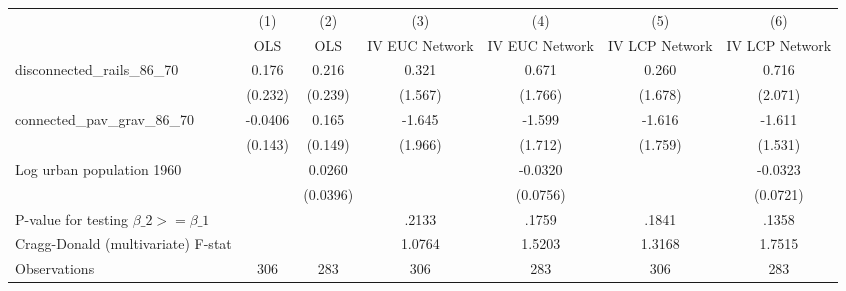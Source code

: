 {
\def\sym#1{\ifmmode^{#1}\else\(^{#1}\)\fi}
\begin{tabular}{l*{6}{c}}
\hline\hline
                &\multicolumn{1}{c}{(1)}&\multicolumn{1}{c}{(2)}&\multicolumn{1}{c}{(3)}&\multicolumn{1}{c}{(4)}&\multicolumn{1}{c}{(5)}&\multicolumn{1}{c}{(6)}\\
                &\multicolumn{1}{c}{OLS}&\multicolumn{1}{c}{OLS}&\multicolumn{1}{c}{IV EUC Network}&\multicolumn{1}{c}{IV EUC Network}&\multicolumn{1}{c}{IV LCP Network}&\multicolumn{1}{c}{IV LCP Network}\\
\hline
disconnected\_rails\_86\_70&    0.176         &    0.216         &    0.321         &    0.671         &    0.260         &    0.716         \\
                &  (0.232)         &  (0.239)         &  (1.567)         &  (1.766)         &  (1.678)         &  (2.071)         \\
[1em]
connected\_pav\_grav\_86\_70&  -0.0406         &    0.165         &   -1.645         &   -1.599         &   -1.616         &   -1.611         \\
                &  (0.143)         &  (0.149)         &  (1.966)         &  (1.712)         &  (1.759)         &  (1.531)         \\
[1em]
Log urban population 1960&                  &   0.0260         &                  &  -0.0320         &                  &  -0.0323         \\
                &                  & (0.0396)         &                  & (0.0756)         &                  & (0.0721)         \\
\hline
P-value for testing $\beta\_{2} >= \beta\_{1}$&                  &                  &    .2133         &    .1759         &    .1841         &    .1358         \\
Cragg-Donald (multivariate) F-stat&                  &                  &   1.0764         &   1.5203         &   1.3168         &   1.7515         \\
Observations    &      306         &      283         &      306         &      283         &      306         &      283         \\
\hline\hline
\end{tabular}
}
